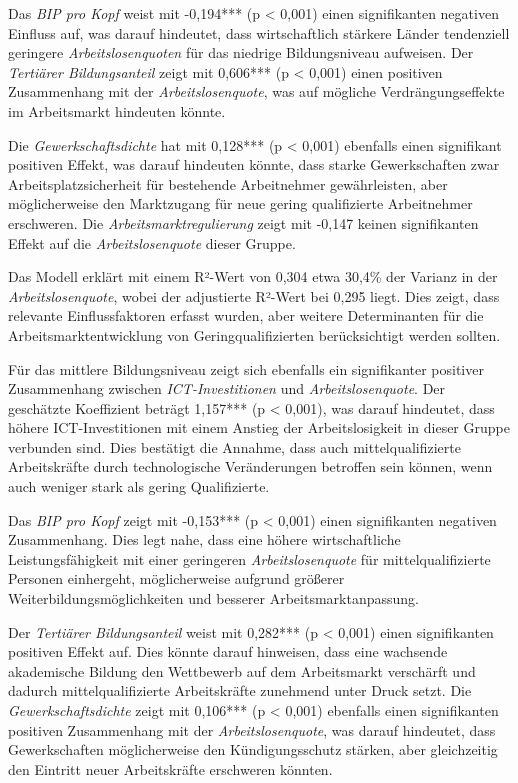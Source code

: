 Das \textit{\ac{BIP} pro Kopf} weist mit -0,194*** (p < 0,001) einen signifikanten 
negativen Einfluss auf, was darauf hindeutet, dass wirtschaftlich stärkere Länder 
tendenziell geringere \textit{Arbeitslosenquoten} für das niedrige Bildungsniveau 
aufweisen. Der \textit{Tertiärer Bildungsanteil} zeigt mit 0,606*** (p < 0,001) einen 
positiven Zusammenhang mit der \textit{Arbeitslosenquote}, was auf mögliche 
Verdrängungseffekte im Arbeitsmarkt hindeuten könnte.

Die \textit{Gewerkschaftsdichte} hat mit 0,128*** (p < 0,001) ebenfalls einen signifikant 
positiven Effekt, was darauf hindeuten könnte, dass starke Gewerkschaften zwar 
Arbeitsplatzsicherheit für bestehende Arbeitnehmer gewährleisten, aber möglicherweise den 
Marktzugang für neue gering qualifizierte Arbeitnehmer erschweren. Die 
\textit{Arbeitsmarktregulierung} zeigt mit -0,147 keinen signifikanten Effekt auf die 
\textit{Arbeitslosenquote} dieser Gruppe.

Das Modell erklärt mit einem R²-Wert von 0,304 etwa 30,4\% der Varianz in der 
\textit{Arbeitslosenquote}, wobei der adjustierte R²-Wert bei 0,295 liegt. Dies zeigt, dass 
relevante Einflussfaktoren erfasst wurden, aber weitere Determinanten für die 
Arbeitsmarktentwicklung von Geringqualifizierten berücksichtigt werden sollten.

Für das mittlere Bildungsniveau zeigt sich ebenfalls ein signifikanter positiver 
Zusammenhang zwischen \textit{\ac{ICT}-Investitionen} und \textit{Arbeitslosenquote}. 
Der geschätzte Koeffizient beträgt 1,157*** (p < 0,001), was darauf hindeutet, dass 
höhere \ac{ICT}-Investitionen mit einem Anstieg der Arbeitslosigkeit in dieser Gruppe 
verbunden sind. Dies bestätigt die Annahme, dass auch mittelqualifizierte Arbeitskräfte 
durch technologische Veränderungen betroffen sein können, wenn auch weniger stark als 
gering Qualifizierte.

Das \textit{\ac{BIP} pro Kopf} zeigt mit -0,153*** (p < 0,001) einen signifikanten 
negativen Zusammenhang. Dies legt nahe, dass eine höhere wirtschaftliche Leistungsfähigkeit 
mit einer geringeren \textit{Arbeitslosenquote} für mittelqualifizierte Personen einhergeht, 
möglicherweise aufgrund größerer Weiterbildungsmöglichkeiten und besserer 
Arbeitsmarktanpassung.

Der \textit{Tertiärer Bildungsanteil} weist mit 0,282*** (p < 0,001) einen signifikanten 
positiven Effekt auf. Dies könnte darauf hinweisen, dass eine wachsende akademische 
Bildung den Wettbewerb auf dem Arbeitsmarkt verschärft und dadurch mittelqualifizierte 
Arbeitskräfte zunehmend unter Druck setzt. Die \textit{Gewerkschaftsdichte} zeigt mit 
0,106*** (p < 0,001) ebenfalls einen signifikanten positiven Zusammenhang mit der 
\textit{Arbeitslosenquote}, was darauf hindeutet, dass Gewerkschaften möglicherweise den 
Kündigungsschutz stärken, aber gleichzeitig den Eintritt neuer Arbeitskräfte erschweren 
könnten.

